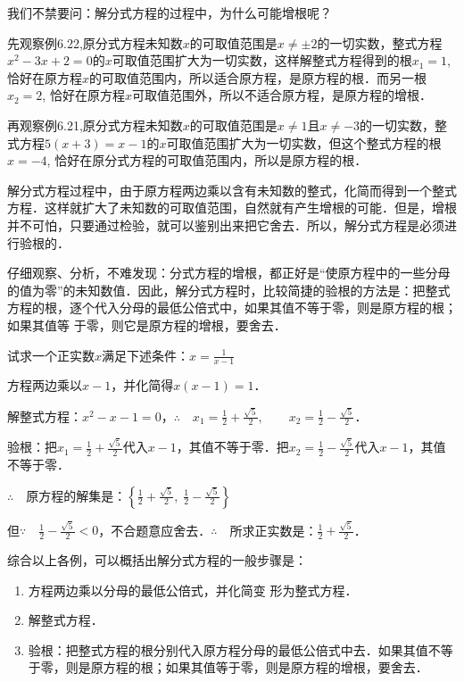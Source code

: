 我们不禁要问：解分式方程的过程中，为什么可能增根呢？

先观察例6.22,原分式方程未知数$x$的可取值范围是$x\ne \pm2$的一切实数，整式方程$x^2-3x+2=0$的$x$可取值范围扩大为一切实数，这样解整式方程得到的根$x_1=1$, 恰好在原方程$x$的可取值范围内，所以适合原方程，是原方程的根．而另一根$x_2=2$, 恰好在原方程$x$可取值范围外，所以不适合原方程，是原方程的增根．

再观察例6.21,原分式方程未知数$x$的可取值范围是$x\ne 1$且$x\ne -3$的一切实数，整式方程$5(x+3)=x-1$的$x$可取值范围扩大为一切实数，但这个整式方程的根$x=-4$, 恰好在原分式方程的可取值范围内，所以是原方程的根．

解分式方程过程中，由于原方程两边乘以含有未知数的整式，化简而得到一个整式方程．这样就扩大了未知数的可取值范围，自然就有产生增根的可能．但是，增根并不可怕，只要通过检验，就可以鉴别出来把它舍去．所以，解分式方程是必须进行验根的．

仔细观察、分析，不难发现：分式方程的增根，都正好是“使原方程中的一些分母的值为零”的未知数值．因此，解分式方程时，比较简捷的验根的方法是：把整式方程的根，逐个代入分母的最低公倍式中，如果其值不等于零，则是原方程的根；如果其值等
于零，则它是原方程的增根，要舍去．


\begin{example}
    试求一个正实数$x$满足下述条件：$x=\frac{1}{x-1}$
\end{example}

\begin{solution}
方程两边乘以$x-1$，并化简得$x(x-1)=1$．

解整式方程：$x^2-x-1=0$，$\therefore\quad x_1=\frac{1}{2}+\frac{\sqrt{5}}{2},\qquad x_2=\frac{1}{2}-\frac{\sqrt{5}}{2}$．

验根：把$x_1=\frac{1}{2}+\frac{\sqrt{5}}{2}$代入$x-1$，其值不等于零．把$x_2=\frac{1}{2}-\frac{\sqrt{5}}{2}$代入$x-1$，其值不等于零．

$\therefore\quad $原方程的解集是：$\left\{\frac{1}{2}+\frac{\sqrt{5}}{2},\; \frac{1}{2}-\frac{\sqrt{5}}{2}\right\}$

但$\because\quad \frac{1}{2}-\frac{\sqrt{5}}{2}<0$，不合题意应舍去．$\therefore\quad $所求正实数是：$\frac{1}{2}+\frac{\sqrt{5}}{2}$．
\end{solution}

综合以上各例，可以概括出解分式方程的一般步骤是：
\begin{enumerate}
    \item 方程两边乘以分母的最低公倍式，并化简变
形为整式方程．
\item 解整式方程．
\item 验根：把整式方程的根分别代入原方程分母的最低公倍式中去．如果其值不等于零，则是原方程的根；如果其值等于零，则是原方程的增根，要舍去．
\end{enumerate}


